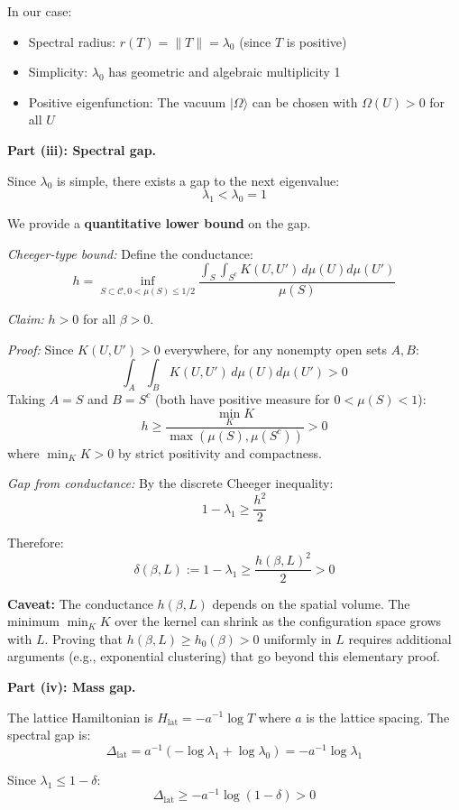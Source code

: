 In our case:
\begin{itemize}
\item Spectral radius: $r(T) = \|T\| = \lambda_0$ (since $T$ is positive)
\item Simplicity: $\lambda_0$ has geometric and algebraic multiplicity 1
\item Positive eigenfunction: The vacuum $|\Omega\rangle$ can be chosen with 
$\Omega(U) > 0$ for all $U$
\end{itemize}

\textbf{Part (iii): Spectral gap.}

Since $\lambda_0$ is simple, there exists a gap to the next eigenvalue:
\[
\lambda_1 < \lambda_0 = 1
\]

We provide a \textbf{quantitative lower bound} on the gap.

\textit{Cheeger-type bound:} Define the conductance:
\[
h = \inf_{S \subset \mathcal{C}, 0 < \mu(S) \leq 1/2} 
\frac{\int_S \int_{S^c} K(U, U') \, d\mu(U) d\mu(U')}{\mu(S)}
\]

\textit{Claim:} $h > 0$ for all $\beta > 0$.

\textit{Proof:} Since $K(U, U') > 0$ everywhere, for any nonempty open sets 
$A, B$:
\[
\int_A \int_B K(U, U') \, d\mu(U) d\mu(U') > 0
\]
Taking $A = S$ and $B = S^c$ (both have positive measure for $0 < \mu(S) < 1$):
\[
h \geq \frac{\min_{K} K}{\max(\mu(S), \mu(S^c))} > 0
\]
where $\min_{K} K > 0$ by strict positivity and compactness.

\textit{Gap from conductance:} By the discrete Cheeger inequality:
\[
1 - \lambda_1 \geq \frac{h^2}{2}
\]

Therefore:
\[
\delta(\beta, L) := 1 - \lambda_1 \geq \frac{h(\beta, L)^2}{2} > 0
\]

\textbf{Caveat:} The conductance $h(\beta, L)$ depends on the spatial volume. 
The minimum $\min_K K$ over the kernel can shrink as the configuration space 
grows with $L$. Proving that $h(\beta, L) \geq h_0(\beta) > 0$ uniformly in $L$ 
requires additional arguments (e.g., exponential clustering) that go beyond 
this elementary proof.

\textbf{Part (iv): Mass gap.}

The lattice Hamiltonian is $H_{\text{lat}} = -a^{-1}\log T$ where $a$ is the 
lattice spacing. The spectral gap is:
\[
\Delta_{\text{lat}} = a^{-1}(-\log \lambda_1 + \log \lambda_0) = -a^{-1}\log \lambda_1
\]

Since $\lambda_1 \leq 1 - \delta$:
\[
\Delta_{\text{lat}} \geq -a^{-1}\log(1 - \delta) > 0
\]

